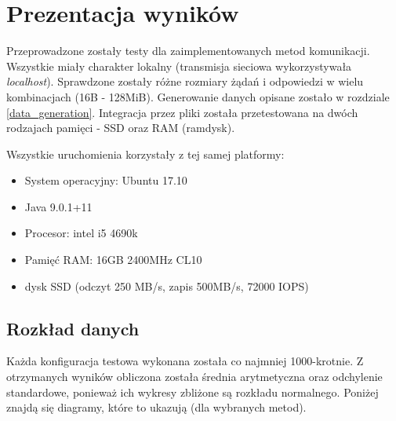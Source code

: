 \chapter{Prezentacja wyników}

Przeprowadzone zostały testy dla zaimplementowanych metod komunikacji. Wszystkie miały charakter lokalny (transmisja sieciowa wykorzystywała \textit{localhost}). Sprawdzone zostały różne rozmiary żądań i odpowiedzi w wielu kombinacjach (16B - 128MiB). Generowanie danych opisane zostało w rozdziale \ref{data_generation}.
Integracja przez pliki została przetestowana na dwóch rodzajach pamięci - SSD oraz RAM (ramdysk).

Wszystkie uruchomienia korzystały z tej samej platformy:
\begin{itemize}
    \item System operacyjny: Ubuntu 17.10
    \item Java 9.0.1+11
    \item Procesor: intel i5 4690k
    \item Pamięć RAM: 16GB 2400MHz CL10
    \item dysk SSD (odczyt 250 MB/s, zapis 500MB/s, 72000 IOPS)
\end{itemize}


\section{Rozkład danych}

Każda konfiguracja testowa wykonana została co najmniej 1000-krotnie. Z otrzymanych wyników obliczona została średnia arytmetyczna oraz odchylenie standardowe, ponieważ ich wykresy zbliżone są rozkładu normalnego. Poniżej znajdą się diagramy, które to ukazują (dla wybranych metod).

\vspace{5mm} 


